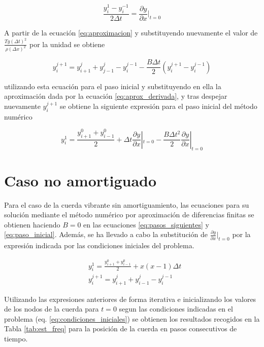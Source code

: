 \documentclass[11pt]{article}
\begin{document}
\begin{equation}
\frac{y^1_i - y^{-1}_i}{2\Delta{t}} = \frac{\partial{y}}{\partial{x}}|_{t=0}
\label{eq:aprox_derivada}
\end{equation}

A partir de la ecuación \ref{eq:aproximacion} y substituyendo nuevamente el valor de 
$\frac{Tg(\Delta{t})^2}{\rho(\Delta{x})^2}$ por la unidad se obtiene

\begin{equation}
y^{j+1}_i = y^{j}_{i+1} + y^{j}_{j-1} - y^{j-1}_i - \frac{B\Delta{t}}{2}(y^{j+1}_i - y^{j-1}_i)
\end{equation}

utilizando esta ecuación para el paso inicial y substituyendo en ella la aproximación dada
por la ecuación \ref{eq:aprox_derivada}, y tras despejar nuevamente $y^{j+1}_i$ se obtiene
la siguiente expresión para el paso inicial del método numérico

\begin{equation}
y^1_i = \frac{y^0_{i+1} + y^0_{i-1}}{2} + \Delta{t}\frac{\partial{y}}{\partial{x}}|_{t=0}
	- \frac{B\Delta{t}^2}{2}\frac{\partial{y}}{\partial{x}}|_{t=0}
\label{eq:paso_inicial}
\end{equation}

\section{Caso no amortiguado}
Para el caso de la cuerda vibrante sin amortiguamiento, las ecuaciones para su
solución mediante el método numérico por aproximación de diferencias finitas se obtienen
haciendo $B=0$ en las ecuaciones \ref{eq:pasos_siguientes} y \ref{eq:paso_inicial}. Además,
se ha llevado a cabo la substitución de $\frac{\partial{y}}{\partial{x}}|_{t=0}$ por la
expresión indicada por las condiciones iniciales del problema.

\begin{subequations}
\begin{flalign}
	&y^1_i = \frac{y^0_{i+1} + y^0_{i-1}}{2} + x(x-1)\Delta{t}\\
	&y^{j+1}_i = y^j_{i+1} + y^j_{i-1} - y^{j-1}_i
\end{flalign}
\end{subequations}

Utilizando las expresiones anteriores de forma iterativa e inicializando los valores de
los nodos de la cuerda para $t=0$ segun las condiciones indicadas en el problema
(eq. \ref{eq:condiciones_iniciales}) se obtienen los resultados recogidos en la Tabla 
\ref{tab:est_freq} para la posición de la cuerda en pasos consecutivos de tiempo. 
\end{document}

